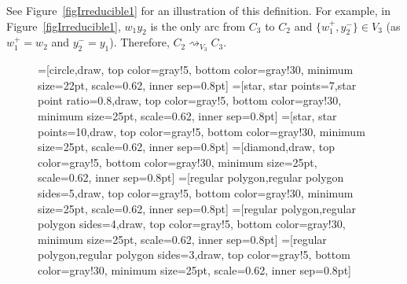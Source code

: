 \documentclass{article}
\newcommand{\wdomV}[1]{\rightsquigarrow_{#1}}
\newcommand{\2}{\vspace{0.2cm}}
\begin{document}
See Figure~\ref{figIrreducible1} for an illustration of this definition. For example, in Figure~\ref{figIrreducible1}, $w_1y_2$ is the only arc
from $C_3$ to $C_2$ and $\{w_1^+,y_2^-\} \in V_3$ (as $w_1^+ = w_2$ and $y_2^- = y_1$). Therefore, $C_2 \wdomV{V_3} C_3$.

\begin{figure}[h]
\begin{center}
=[circle,draw, top color=gray!5, bottom color=gray!30, minimum size=22pt, scale=0.62, inner sep=0.8pt]
=[star, star points=7,star point ratio=0.8,draw, top color=gray!5, bottom color=gray!30, minimum size=25pt, scale=0.62, inner sep=0.8pt]
=[star, star points=10,draw, top color=gray!5, bottom color=gray!30, minimum size=25pt, scale=0.62, inner sep=0.8pt]
=[diamond,draw, top color=gray!5, bottom color=gray!30, minimum size=25pt, scale=0.62, inner sep=0.8pt]
=[regular polygon,regular polygon sides=5,draw, top color=gray!5, bottom color=gray!30, minimum size=25pt, scale=0.62, inner sep=0.8pt]
=[regular polygon,regular polygon sides=4,draw, top color=gray!5, bottom color=gray!30, minimum size=25pt, scale=0.62, inner sep=0.8pt]
=[regular polygon,regular polygon sides=3,draw, top color=gray!5, bottom color=gray!30, minimum size=25pt, scale=0.62, inner sep=0.8pt]
\end{center}
\end{figure}
\end{document}
